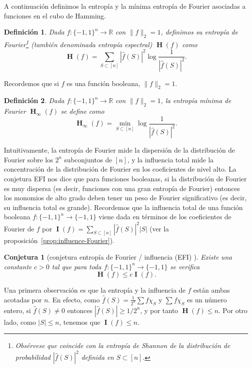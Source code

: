 \documentclass[autocontact]{gaceta}
\newcommand{\R}{\mathbb{R}}
\newtheorem{definition}{Definición}
\newtheorem{conjecture}{Conjetura}
\DeclareMathOperator{\II}{\mathbf{I}}
\DeclareMathOperator{\HH}{\mathbf{H}}
\begin{document}
A continuación definimos la entropía y la mínima entropía de Fourier asociadas a funciones en el cubo de Hamming.

\begin{definition} Dada $f:\{-1,1\}^n \to \R$ con $\|f\|_2=1$, definimos su \emph{entropía de Fourier}\footnote{Obsérvese que coincide con la entropía de Shannon de la distribución de probabilidad $|\widehat{f}(S)|^2$ definida en $S\subset [n]$.} (también denominada \emph{entropía espectral}) $\HH(f)$ como
\[
\HH(f) = \sum_{S\subset [n]} |\widehat{f}(S)|^2\log \frac{1}{|\widehat{f}(S)|^2}.
\]
\end{definition}

Recordemos que si $f$ es una función booleana, $\|f\|_2=1$.

\begin{definition} Dada $f:\{-1,1\}^n \to \R$ con $\|f\|_2=1$, la \emph{entropía mínima de Fourier} $\HH_{\infty}(f)$ se define como
\[
\HH_{\infty}(f) = \min_{S\subset [n]} \log \frac{1}{|\widehat{f}(S)|^2}.
\]
\end{definition}

Intuitivamente,
la entropía de Fourier mide la dispersión de la distribución de Fourier sobre los $2^n$ subconjuntos de $[n]$, y la influencia total mide la concentración de la distribución de Fourier en los coeficientes de nivel alto.
La conjetura EFI nos dice que para funciones booleanas, si la distribución de Fourier es muy dispersa (es decir, funciones con una gran entropía de Fourier) entonces los monomios de alto grado deben tener un peso de Fourier significativo (es decir, su influencia total es grande). Recordemos que la influencia total de una función booleana $f:\{-1,1\}^n\to \{-1,1\}$ viene dada en términos de los coeficientes de Fourier de $f$ por $\II(f)=\sum_{S\subset [n]} |\widehat{f}(S)|^2 |S|$ (ver la proposición~\ref{prop:influence-Fourier}).

\begin{conjecture}[conjetura entropía de Fourier / influencia (EFI) \cite{FK96}]
Existe una constante $c>0$ tal que para toda $f:\{-1,1\}^n\to\{-1,1\}$ se verifica
\[
\HH(f)\leq c \II(f).
\]
\end{conjecture}

Una primera observación es que la entropía y la influencia de $f$ están ambas acotadas por $n$. En efecto, como $\widehat{f}(S)=\frac{1}{2^n}\sum f \chi_S$ y $\sum f \chi_S$ es un número entero, si $\widehat{f}(S)\neq 0$ entonces $|\widehat{f}(S)|\geq 1/2^n$, y por tanto $\HH(f) \leq n$. Por otro lado, como $|S|\leq n$, tenemos que $\II(f)\leq n$.
\end{document}

